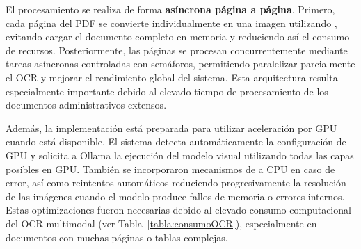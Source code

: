 El procesamiento se realiza de forma \textbf{asíncrona página a página}. Primero, cada página del PDF se convierte individualmente en una imagen utilizando , evitando cargar el documento completo en memoria y reduciendo así el consumo de recursos. Posteriormente, las páginas se procesan concurrentemente mediante tareas asíncronas controladas con semáforos, permitiendo paralelizar parcialmente el OCR y mejorar el rendimiento global del sistema. Esta arquitectura resulta especialmente importante debido al elevado tiempo de procesamiento de los documentos administrativos extensos.

Además, la implementación está preparada para utilizar aceleración por GPU cuando está disponible. El sistema detecta automáticamente la configuración de GPU y solicita a Ollama la ejecución del modelo visual utilizando todas las capas posibles en GPU. También se incorporaron mecanismos de  a CPU en caso de error, así como reintentos automáticos reduciendo progresivamente la resolución de las imágenes cuando el modelo produce fallos de memoria o errores internos. Estas optimizaciones fueron necesarias debido al elevado consumo computacional del OCR multimodal (ver Tabla~\ref{tabla:consumoOCR}), especialmente en documentos con muchas páginas o tablas complejas.

